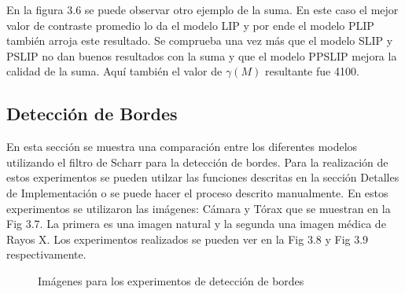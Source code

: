 En la figura 3.6 se puede observar otro ejemplo de la suma. En este caso el mejor valor de contraste promedio lo da el modelo LIP y por ende el modelo PLIP tambi\'en arroja este resultado. Se comprueba una vez m\'as que el modelo SLIP y PSLIP no dan buenos resultados con la suma y que el modelo PPSLIP mejora la calidad de la suma. Aqu\'i tambi\'en el valor de $\gamma(M)$ resultante fue 4100.

\subsection{Detecci\'on de Bordes}

En esta secci\'on se muestra una comparaci\'on entre los diferentes modelos utilizando el filtro de Scharr para la detecci\'on de bordes. Para la realizaci\'on de estos experimentos se pueden utilzar las funciones descritas en la secci\'on Detalles de Implementaci\'on o se puede hacer el proceso descrito manualmente. En estos experimentos se utilizaron las im\'agenes: C\'amara y T\'orax que se muestran en la Fig 3.7. La primera es una imagen natural y la segunda una imagen m\'edica de Rayos X. Los experimentos realizados se pueden ver en la Fig 3.8 y Fig 3.9 respectivamente.

\begin{figure}
	\begin{center}
		\caption{Im\'agenes para los experimentos de detecci\'on de bordes}
	\end{center}
\end{figure}

